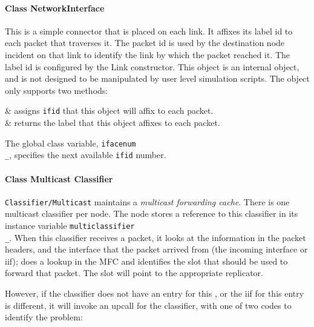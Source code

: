 \paragraph{Class NetworkInterface}
This is a simple connector that is placed on each link.  It affixes
its label id to each packet that traverses it.  The packet id is used
by the destination node incident on that link to identify the link by
which the packet reached it.  The label id is configured by the Link
constructor.  This object is an internal object, and is not designed
to be manipulated by user level simulation scripts.  The object only
supports two methods:
\begin{\par\tabular{\textwidth}{rX}}
 & 
        assigns {\tt ifid} that this object will affix to each packet. \\
 & 
        returns the label that this object affixes to each packet.\\
\end{\par\tabular{\textwidth}{rX}}
The global class variable, {\tt ifacenum\\_}, specifies the next
available {\tt ifid} number.

\paragraph{Class Multicast Classifier}
{\tt Classifier/Multicast} maintains a \emph{multicast forwarding
cache}.  There is one multicast classifier per node. The node stores a
reference to this classifier in its instance variable
{\tt multiclassifier\\_}. When this classifier receives a packet, it
looks at the  information in the packet headers,
and the interface that the packet arrived from (the incoming interface
or iif); does a lookup in the MFC and identifies the slot that should
be used to forward that packet.  The slot will point to the
appropriate replicator.

However, if the classifier does not have an entry for this
, or the iif for this entry is different, it will
invoke an upcall  for the classifier, with one of
two codes to identify the problem:

